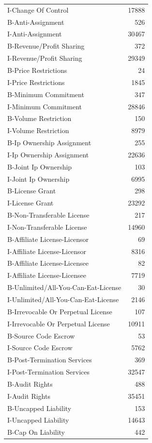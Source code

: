 \begin{tabular}{lr}
I-Change Of Control & 17888 \\
B-Anti-Assignment & 526 \\
I-Anti-Assignment & 30467 \\
B-Revenue/Profit Sharing & 372 \\
I-Revenue/Profit Sharing & 29349 \\
B-Price Restrictions & 24 \\
I-Price Restrictions & 1845 \\
B-Minimum Commitment & 347 \\
I-Minimum Commitment & 28846 \\
B-Volume Restriction & 150 \\
I-Volume Restriction & 8979 \\
B-Ip Ownership Assignment & 255 \\
I-Ip Ownership Assignment & 22636 \\
B-Joint Ip Ownership & 103 \\
I-Joint Ip Ownership & 6995 \\
B-License Grant & 298 \\
I-License Grant & 23292 \\
B-Non-Transferable License & 217 \\
I-Non-Transferable License & 14960 \\
B-Affiliate License-Licensor & 69 \\
I-Affiliate License-Licensor & 8316 \\
B-Affiliate License-Licensee & 82 \\
I-Affiliate License-Licensee & 7719 \\
B-Unlimited/All-You-Can-Eat-License & 30 \\
I-Unlimited/All-You-Can-Eat-License & 2146 \\
B-Irrevocable Or Perpetual License & 107 \\
I-Irrevocable Or Perpetual License & 10911 \\
B-Source Code Escrow & 53 \\
I-Source Code Escrow & 5762 \\
B-Post-Termination Services & 369 \\
I-Post-Termination Services & 32547 \\
B-Audit Rights & 488 \\
I-Audit Rights & 35451 \\
B-Uncapped Liability & 153 \\
I-Uncapped Liability & 14643 \\
B-Cap On Liability & 442 \\

\end{tabular}
